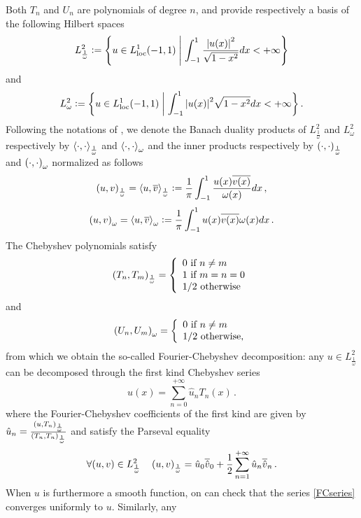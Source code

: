 \documentclass[a4paper]{article}
\begin{document}
Both $T_n$ and $U_n$ are polynomials of degree $n$, and provide respectively a basis of the following Hilbert spaces
$$L^2_{\frac{1}{\omega}} \mathrel{\mathop:}= \left\{u \in L^1_\textup{loc}(-1,1)\mathrel{}\middle|\mathrel{}\int_{-1}^{1} \dfrac{\left\lvert u(x) \right\rvert^2}{\sqrt{1 - x^2} }dx< + \infty\right\}$$
and 
$$L^2_{\omega} \mathrel{\mathop:}= \left\{u \in L^1_\textup{loc}(-1,1)\mathrel{}\middle|\mathrel{}\int_{-1}^{1} {\left\lvert u(x) \right\rvert^2}{\sqrt{1 - x^2} }dx< + \infty\right\}.$$
Following the notations of \cite{mclean2000strongly}, we denote the Banach duality products of $L^2_\frac{1}{\omega}$ and $L^2_\omega$ respectively by $\left\langle \cdot,\cdot\right\rangle_\frac{1}{\omega}$ and $\left\langle \cdot,\cdot\right\rangle_\omega$ and the inner products respectively by $\left( \cdot,\cdot\right)_\frac{1}{\omega}$ and $\left( \cdot,\cdot\right)_\omega$ normalized as follows
\[\left( u,v\right)_{\frac{1}{\omega}} = \left\langle u,\overline v\right\rangle_\frac{1}{\omega} \mathrel{\mathop:}= \frac{1}{\pi}\int_{-1}^{1} \frac{u(x) \overline{v(x)}}{\omega(x)}dx\,,\]
\[\left( u,v\right)_{\omega} = \left\langle u,\overline v\right\rangle_{\omega} \mathrel{\mathop:}= \frac{1}{\pi}\int_{-1}^{1} {u(x) \overline{v(x)}}{\omega(x)}dx\,.\]
The Chebyshev polynomials satisfy
\begin{equation}
	\left( T_n,T_m\right)_\frac{1}{\omega} = \left\{
	\begin{array}{l}
	0 \mbox{ if } n\ne m\\
	1 \mbox{ if } m=n=0\\
	1/2 \mbox{ otherwise}
	\end{array} 
	\right.
\end{equation}
and
\begin{equation}
	\left( U_n,U_m\right)_{\omega} = \left\{
	\begin{array}{l}
	0 \mbox{ if } n\ne m\\
	1/2 \mbox{ otherwise,}
	\end{array} 
	\right.
\end{equation}
from which we obtain the so-called Fourier-Chebyshev decomposition: any
$u\in L^2_{\frac{1}{\omega}}$ can be decomposed through the first kind Chebyshev series 
\begin{equation}
	u(x) = \sum_{n=0}^{+\infty} \hat{u}_n T_n(x)\,.
	\label{FCseries}
\end{equation}
where the Fourier-Chebyshev coefficients of the first kind are given by $\hat{u}_n = \frac{\left( u,T_n\right)_{\frac{1}{\omega}}}{\left( T_n,T_n\right)_{\frac{1}{\omega}}}$ and satisfy the Parseval equality
\[\forall (u,v) \in L^2_\frac{1}{\omega} \quad  \left( u,v\right)_\frac{1}{\omega} = \hat{u}_0 \overline{\hat{v}}_0 + \frac{1}{2}\sum_{n=1}^{+\infty}\hat{u}_n \overline{\hat{v}}_n \,.\]
When $u$ is furthermore a smooth function, on can check that the series \eqref{FCseries} converges uniformly to $u$. Similarly, any 
\end{document}
